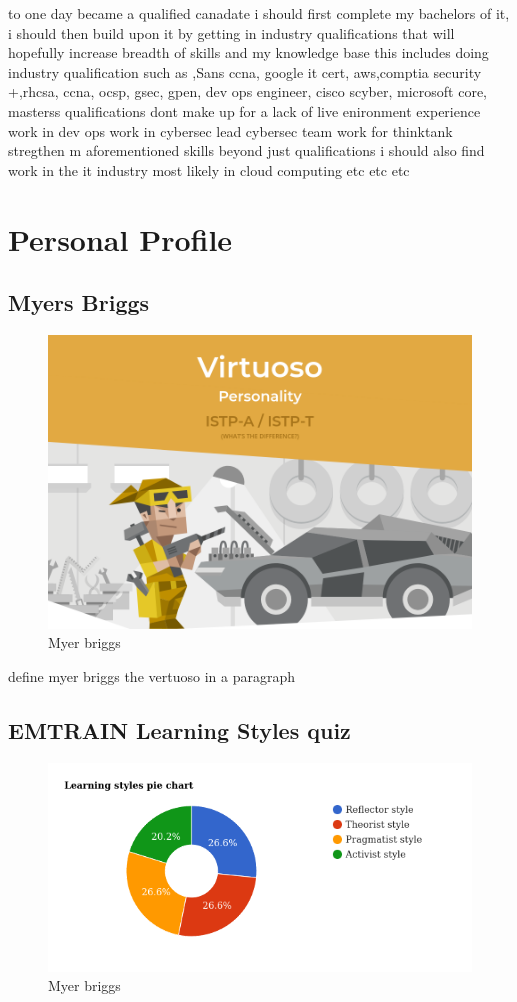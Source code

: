 \documentclass{article}
\begin{document}
to one  day became a qualified canadate i should first complete my bachelors of it, i should then build upon it by getting in industry qualifications that will hopefully increase breadth of skills and my knowledge base this includes doing industry qualification such as ,Sans ccna, google it cert, aws,comptia security +,rhcsa, ccna, ocsp, gsec, gpen, dev ops engineer, cisco scyber, microsoft core, masterss
qualifications dont make up for a lack of live enironment experience
work in dev ops work in cybersec lead cybersec team work for thinktank  stregthen m aforementioned skills
beyond just qualifications i should also find work in the it industry most likely in cloud computing  etc etc etc 


\section{Personal Profile}
\subsection{Myers Briggs}
\begin{figure}[h]
\centering
\includegraphics[width=\textwidth]{istp-t.png}
\caption{Myer briggs}
\end{figure}
 define myer briggs the vertuoso in a paragraph

 \subsection{EMTRAIN Learning Styles quiz}
\begin{figure}[h]
\centering
\includegraphics[width=\textwidth]{istp.png}
\caption{Myer briggs}
\end{figure}
\end{document}
